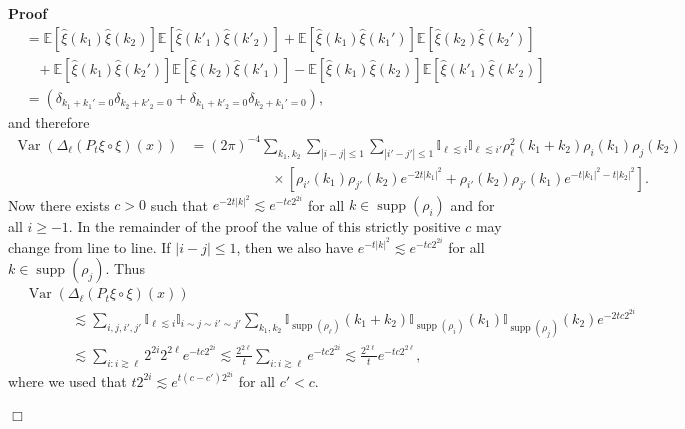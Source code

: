 \documentclass[a4paper,11pt]{article}
\newcommand{\tmop}[1]{\ensuremath{\operatorname{#1}}}
\newenvironment{proof}{\noindent\textbf{Proof\ }}{\hspace*{\fill}$\Box$\medskip}
\newcommand{\reso}{\,\mathord{\circ}\,}
\begin{document}
\begin{proof}
\begin{align*}
     & =\mathbb{E} [\hat{\xi} (k_1) \hat{\xi} (k_2)] \mathbb{E} [\hat{\xi}(k'_1) \hat{\xi} (k'_2)] +\mathbb{E} [\hat{\xi} (k_1) \hat{\xi} (k_1')] \mathbb{E} [\hat{\xi} (k_2) \hat{\xi} (k_2')] \\
     &\hspace{10pt} + \mathbb{E} [\hat{\xi} (k_1) \hat{\xi} (k_2')] \mathbb{E} [\hat{\xi}(k_2) \hat{\xi} (k'_1)] -\mathbb{E} [\hat{\xi} (k_1) \hat{\xi} (k_2)] \mathbb{E} [\hat{\xi} (k'_1) \hat{\xi} (k'_2)] \\
     & = (\delta_{k_1 + k_1' = 0} \delta_{k_2 + k'_2 = 0} + \delta_{k_1 + k'_2 = 0} \delta_{k_2 + k_1' = 0}),
  \end{align*}
  and therefore
  \begin{align*}
    \tmop{Var} (\Delta_{\ell} (P_t \xi \reso \xi) (x)) & = (2 \pi)^{- 4}
    \sum_{k_1, k_2} \sum_{|i - j| \leqslant 1} \sum_{|i' - j' | \leqslant 1}
    \mathbb{I}_{\ell \lesssim i} \mathbb{I}_{\ell \lesssim i'} \rho^2_{\ell}
    (k_1 + k_2) \rho_i (k_1) \rho_j (k_2) \\
    &\hspace{70pt} \times [\rho_{i'} (k_1) \rho_{j'} (k_2) e^{- 2 t|k_1 |^2} + \rho_{i'}
    (k_2) \rho_{j'} (k_1) e^{- t|k_1 |^2 - t|k_2 |^2}] .
  \end{align*}
  Now there exists $c > 0$ such that $e^{- 2 t |k|^2} \lesssim e^{- tc 2^{2
  i}}$ for all $k \in \tmop{supp} (\rho_i)$ and for all $i \ge - 1$. In the
  remainder of the proof the value of this strictly positive $c$ may change
  from line to line. If $|i - j| \leqslant 1$, then we also have $e^{- t
  |k|^2} \lesssim e^{- tc 2^{2 i}}$ for all $k \in \tmop{supp} (\rho_j)$. Thus
  \begin{align*}
    & \tmop{Var} (\Delta_{\ell} (P_t \xi \reso \xi) (x)) \\
    & \hspace{40pt} \lesssim \sum_{i, j, i', j'} \mathbb{I}_{\ell \lesssim i} \mathbb{I}_{i \sim j \sim i' \sim j'} \sum_{k_1, k_2}  \mathbb{I}_{\tmop{supp} (\rho_{\ell})} (k_1 + k_2) \mathbb{I}_{\tmop{supp} (\rho_i)} (k_1) \mathbb{I}_{\tmop{supp} (\rho_j)} (k_2) e^{- 2 tc 2^{2 i}} \\
    & \hspace{40pt} \lesssim \sum_{i : i \gtrsim \ell} 2^{2 i} 2^{2 \ell} e^{- tc 2^{2 i}} \lesssim \frac{2^{2 \ell}}{t} \sum_{i : i \gtrsim \ell} e^{- tc 2^{2 i}} \lesssim \frac{2^{2 \ell}}{t} e^{- tc 2^{2 \ell}}, & 
  \end{align*}
  where we used that $t 2^{2 i} \lesssim e^{t (c - c') 2^{2 i}}$ for all $c' <
  c$.
  

\end{proof}
\end{document}
